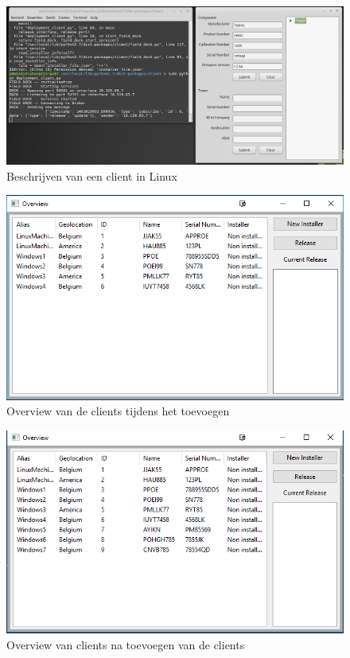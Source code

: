 \begin{figure}
\centering
\includegraphics[width=\textwidth,height=\textheight,keepaspectratio]{afbeelding/testMultiClient/beschrijvenTorenLinux_cut.png}
\caption{Beschrijven van een client in Linux}
\label{fig:testClient:linuxBeschrijving}
\end{figure}

\begin{figure}[!ht]
\centering
\includegraphics[scale=0.9]{afbeelding/testMultiClient/overview1.png}
\caption{Overview van de clients tijdens het toevoegen}
\label{fig:testClient:overviewTijdensToevoegen}
\end{figure}

\begin{figure}[!ht]
\centering
\includegraphics[scale=0.9]{afbeelding/testMultiClient/beforeRelease.png}
\caption{Overview van clients na toevoegen van de clients}
\label{fig:testClient:setup}
\end{figure}

